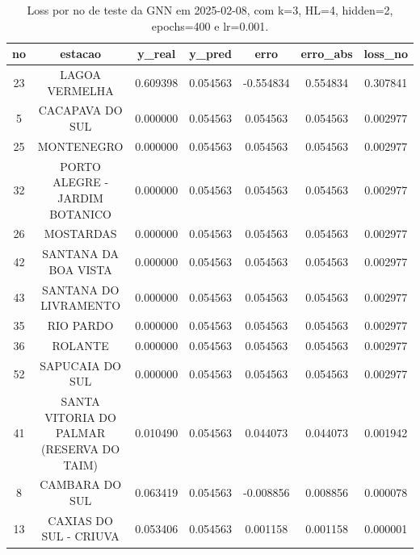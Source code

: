\begin{table}[h]
\centering
\caption{Loss por no de teste da GNN em 2025-02-08, com k=3, HL=4, hidden=2, epochs=400 e lr=0.001.}
\label{tab:gnn_loss_k3_hl4_h2_e400_d20250208}
\begin{tabular}{ccccccc}
\toprule
no & estacao & y\_real & y\_pred & erro & erro\_abs & loss\_no \\
\midrule
23 & LAGOA VERMELHA & 0.609398 & 0.054563 & -0.554834 & 0.554834 & 0.307841 \\
5 & CACAPAVA DO SUL & 0.000000 & 0.054563 & 0.054563 & 0.054563 & 0.002977 \\
25 & MONTENEGRO & 0.000000 & 0.054563 & 0.054563 & 0.054563 & 0.002977 \\
32 & PORTO ALEGRE - JARDIM BOTANICO & 0.000000 & 0.054563 & 0.054563 & 0.054563 & 0.002977 \\
26 & MOSTARDAS & 0.000000 & 0.054563 & 0.054563 & 0.054563 & 0.002977 \\
42 & SANTANA DA BOA VISTA & 0.000000 & 0.054563 & 0.054563 & 0.054563 & 0.002977 \\
43 & SANTANA DO LIVRAMENTO & 0.000000 & 0.054563 & 0.054563 & 0.054563 & 0.002977 \\
35 & RIO PARDO & 0.000000 & 0.054563 & 0.054563 & 0.054563 & 0.002977 \\
36 & ROLANTE & 0.000000 & 0.054563 & 0.054563 & 0.054563 & 0.002977 \\
52 & SAPUCAIA DO SUL & 0.000000 & 0.054563 & 0.054563 & 0.054563 & 0.002977 \\
41 & SANTA VITORIA DO PALMAR (RESERVA DO TAIM) & 0.010490 & 0.054563 & 0.044073 & 0.044073 & 0.001942 \\
8 & CAMBARA DO SUL & 0.063419 & 0.054563 & -0.008856 & 0.008856 & 0.000078 \\
13 & CAXIAS DO SUL - CRIUVA & 0.053406 & 0.054563 & 0.001158 & 0.001158 & 0.000001 \\
\bottomrule
\end{tabular}
\end{table}
